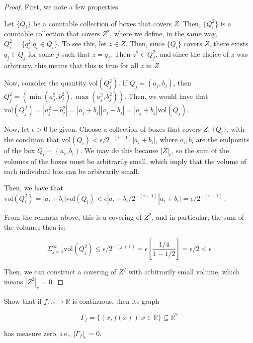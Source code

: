 \documentclass[10pt]{article}
\newenvironment{problem}[2][Problem]{\begin{trivlist}
\item[\hskip \labelsep {\bfseries #1}\hskip \labelsep {\bfseries #2.}]}{\end{trivlist}}
\begin{document}
\begin{proof}[Proof]
First, we note a few properties.

Let $\{ Q_i \}$ be a countable collection of boxes that covers $Z$. Then, $\{Q_i^2\}$ is a countable collection that covers $Z^2$, where we define, in the same way, $Q_i^2 = \{ q_i^2 | q_i \in Q_i\}$. To see this, let $z \in Z$. Then, since $\{ Q_i \}$ covers $Z$, there exists $q_j \in Q_j$ for some $j$ such that $z = q_j$. Then $z^2 \in Q_j^2$, and since the choice of $z$ was arbitrary, this means that this is true for all $z$ in $Z$.

Now, consider the quantity $\text{vol}(Q_j^2)$. If $Q_j = (a_j,b_j)$, then $Q_j^2 = (\min(a_j^2,b_j^2), \max(a_j^2,b_j^2))$. Then, we would have that  $\text{vol}(Q_j^2) = |a_j^2 - b_j^2| = |a_j + b_j||a_j - b_j| =  |a_j + b_j|\text{vol}(Q_j)$.

Now, let $\epsilon > 0$ be given. Choose a collection of boxes that covers $Z$, $\{ Q_i \}$, with the condition that $\text{vol}(Q_i) < \epsilon / 2^{-(i+1)} |a_i + b_i|$, where $a_i, b_i$ are the endpoints of the box $Q_i = (a_i,b_i)$. We may do this because $|Z|_e$, so the sum of the volumes of the boxes must be arbitrarily small, which imply that the volume of each individual box can be arbitrarily small.

Then, we have that $\text{vol}(Q_i^2) =  |a_i + b_i|\text{vol}(Q_i) < \epsilon |a_i + b_i / 2^{-(i+1)} |a_i + b_i| = \epsilon/2^{-(i+1)}$.

From the remarks above, this is a covering of $Z^2$, and in particular, the sum of the volumes then is:

$$ \Sigma_{j = 1}^{\infty}\text{vol}(Q_j^2) \leq   \epsilon/2^{-(j+1)} = \epsilon[\frac{1/4}{1- 1/2}] = \epsilon/2 < \epsilon$$

Then, we can construct a covering of $Z^2$ with arbitrarily small volume, which means $|Z^2|_e = 0$.
\end{proof}

\begin{problem}{2.1.32}
Show that if $f: \mathbb{R} \rightarrow \mathbb{R}$ is continuous, then its graph

$$ \Gamma_f = \{ (x, f(x)) | x \in \mathbb{R}\} \subseteq \mathbb{R}^2$$

has measure zero, i.e., $|\Gamma_f|_e = 0$.
\end{problem}
\end{document}
